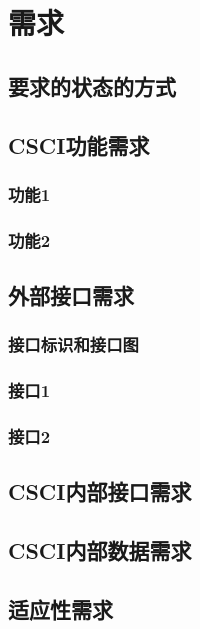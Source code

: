\section{需求}
\subsection{要求的状态的方式}

\subsection{CSCI功能需求}
\subsubsection{功能1}

\subsubsection{功能2}

\subsection{外部接口需求}

\subsubsection{接口标识和接口图}

\subsubsection{接口1}

\subsubsection{接口2}

\subsection{CSCI内部接口需求}

\subsection{CSCI内部数据需求}

\subsection{适应性需求}


